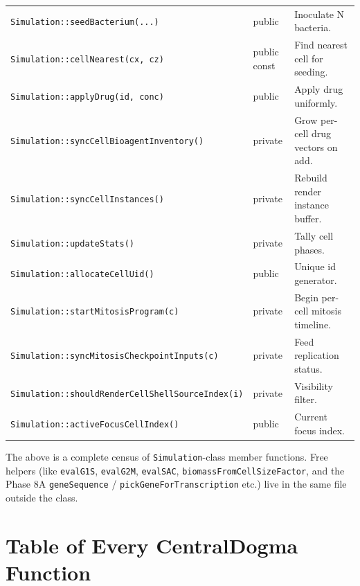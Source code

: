 \documentclass[11pt,letterpaper,twoside,openany]{book}
\newcommand{\code}[1]{\texttt{#1}}
\begin{document}
\begin{longtable}{p{5.2cm}p{2.0cm}p{7.0cm}}
\code{Simulation::seedBacterium(...)} & public & Inoculate N bacteria.\\
\code{Simulation::cellNearest(cx, cz)} & public const & Find nearest cell for seeding.\\
\code{Simulation::applyDrug(id, conc)} & public & Apply drug uniformly.\\
\code{Simulation::syncCellBioagentInventory()} & private & Grow per-cell drug vectors on add.\\
\code{Simulation::syncCellInstances()} & private & Rebuild render instance buffer.\\
\code{Simulation::updateStats()} & private & Tally cell phases.\\
\code{Simulation::allocateCellUid()} & public & Unique id generator.\\
\code{Simulation::startMitosisProgram(c)} & private & Begin per-cell mitosis timeline.\\
\code{Simulation::syncMitosisCheckpointInputs(c)} & private & Feed replication status.\\
\code{Simulation::shouldRenderCellShellSourceIndex(i)} & private & Visibility filter.\\
\code{Simulation::activeFocusCellIndex()} & public & Current focus index.\\
\bottomrule
\end{longtable}

The above is a complete census of \code{Simulation}-class member
functions. Free helpers (like \code{evalG1S}, \code{evalG2M},
\code{evalSAC}, \code{biomassFromCellSizeFactor}, and the Phase 8A
\code{geneSequence} / \code{pickGeneForTranscription} etc.) live in
the same file outside the class.

\chapter{Table of Every CentralDogma Function}
\label{ch:cdogma-funcs}
\end{document}
